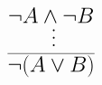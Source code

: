 \documentclass[14pt,border=2pt]{standalone}
\begin{document}
        $$
        \LARGE 

\begin{prooftree}
\hypo{\neg A \land \neg B} \ellipsis{}{ \overline{\neg (A \lor B)} }
\end{prooftree}
        $$
        
\end{document}

